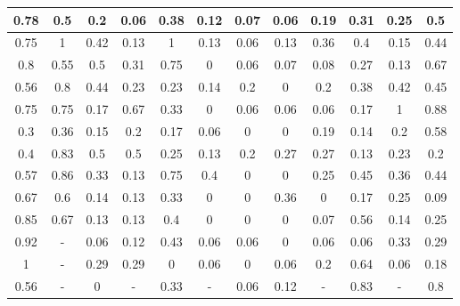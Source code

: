 \begin{table}[H]
\begin{tabular}{|c|c|c|c|c|c|c|c|c|c|c|c|}
0.78 & 0.5  & 0.2  & 0.06 & 0.38 & 0.12 & 0.07 & 0.06 & 0.19 & 0.31 & 0.25 & 0.5  \\ \hline
0.75 & 1    & 0.42 & 0.13 & 1    & 0.13 & 0.06 & 0.13 & 0.36 & 0.4  & 0.15 & 0.44 \\ \hline
0.8  & 0.55 & 0.5  & 0.31 & 0.75 & 0    & 0.06 & 0.07 & 0.08 & 0.27 & 0.13 & 0.67 \\ \hline
0.56 & 0.8  & 0.44 & 0.23 & 0.23 & 0.14 & 0.2  & 0    & 0.2  & 0.38 & 0.42 & 0.45 \\ \hline
0.75 & 0.75 & 0.17 & 0.67 & 0.33 & 0    & 0.06 & 0.06 & 0.06 & 0.17 & 1    & 0.88 \\ \hline
0.3  & 0.36 & 0.15 & 0.2  & 0.17 & 0.06 & 0    & 0    & 0.19 & 0.14 & 0.2  & 0.58 \\ \hline
0.4  & 0.83 & 0.5  & 0.5  & 0.25 & 0.13 & 0.2  & 0.27 & 0.27 & 0.13 & 0.23 & 0.2  \\ \hline
0.57 & 0.86 & 0.33 & 0.13 & 0.75 & 0.4  & 0    & 0    & 0.25 & 0.45 & 0.36 & 0.44 \\ \hline
0.67 & 0.6  & 0.14 & 0.13 & 0.33 & 0    & 0    & 0.36 & 0    & 0.17 & 0.25 & 0.09 \\ \hline
0.85 & 0.67 & 0.13 & 0.13 & 0.4  & 0    & 0    & 0    & 0.07 & 0.56 & 0.14 & 0.25 \\ \hline
0.92 & -    & 0.06 & 0.12 & 0.43 & 0.06 & 0.06 & 0    & 0.06 & 0.06 & 0.33 & 0.29 \\ \hline
1    & -    & 0.29 & 0.29 & 0    & 0.06 & 0    & 0.06 & 0.2  & 0.64 & 0.06 & 0.18 \\ \hline
0.56 & -    & 0    & -    & 0.33 & -    & 0.06 & 0.12 & -    & 0.83 & -    & 0.8  \\ \hline
\end{tabular}
\vspace*{15px}
\end{table}



